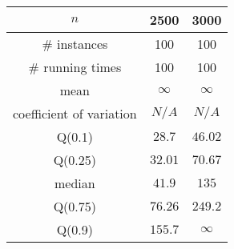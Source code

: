 \begin{tabular}{c|cc} 
\hline 
$n$ & 2500 & 3000 \tabularnewline 
\hline 
\# instances & 100 & 100 \tabularnewline 
\# running times & 100 & 100 \tabularnewline 
mean & $\infty $ & $\infty $ \tabularnewline 
coefficient of variation & $N/A$ & $N/A$ \tabularnewline 
Q(0.1) & $28.7$ & $46.02$ \tabularnewline 
Q(0.25) & $32.01$ & $70.67$ \tabularnewline 
median & $41.9$ & $135$ \tabularnewline 
Q(0.75) & $76.26$ & $249.2$ \tabularnewline 
Q(0.9) & $155.7$ & $\infty $ \tabularnewline 
\hline 
\end{tabular} 
\medskip{} 

